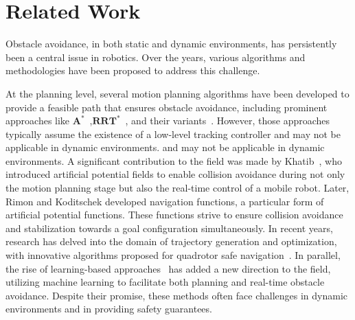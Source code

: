 \section{Related Work}
\label{sec: relate_work}

Obstacle avoidance, in both static and dynamic environments, has persistently been a central issue in robotics. Over the years, various algorithms and methodologies have been proposed to address this challenge.

At the planning level, several motion planning algorithms have been developed to provide a feasible path that ensures obstacle avoidance, including prominent approaches like $\textbf{A}^*$~\cite{A_star_planning},$\textbf{RRT}^*$~\cite{RRT_star}, and their variants~\cite{informed_rrt_star, neural_rrt_star}. However, those approaches typically assume the existence of a low-level tracking controller and may not be applicable in dynamic environments. and may not be applicable in dynamic environments. A significant contribution to the field was made by Khatib~\cite{potential-field}, who introduced artificial potential fields to enable collision avoidance during not only the motion planning stage but also the real-time control of a mobile robot. Later, Rimon and Koditschek \cite{navigation-function} developed navigation functions, a particular form of artificial potential functions. These functions strive to ensure collision avoidance and stabilization towards a goal configuration simultaneously. 
In recent years, research has delved into the domain of trajectory generation and optimization, with innovative algorithms proposed for quadrotor safe navigation~\cite{mellinger_snap_2011, zhou2019robust, tordesillas2019faster}. In parallel, the rise of learning-based approaches~\cite{michels2005high, pfeiffer2018reinforced, loquercio2021learning} has added a new direction to the field, utilizing machine learning to facilitate both planning and real-time obstacle avoidance. Despite their promise, these methods often face challenges in dynamic environments and in providing safety guarantees.


